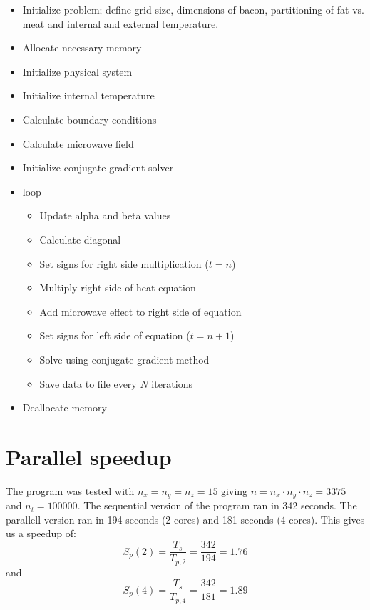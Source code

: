 \begin{itemize}
  \item Initialize problem; define grid-size, dimensions of bacon, partitioning
    of fat vs. meat and internal and external temperature.
  \item Allocate necessary memory
  \item Initialize physical system
  \item Initialize internal temperature
  \item Calculate boundary conditions
  \item Calculate microwave field
  \item Initialize conjugate gradient solver
  \item loop
  \begin{itemize}
    \item Update alpha and beta values
    \item Calculate diagonal
    \item Set signs for right side multiplication ($t=n$)
    \item Multiply right side of heat equation
    \item Add microwave effect to right side of equation
    \item Set signs for left side of equation ($t=n+1$)
    \item Solve using conjugate gradient method
    \item Save data to file every $N$ iterations
  \end{itemize}
\item Deallocate memory
\end{itemize}

\section{Parallel speedup}

The program was tested with $n_x=n_y=n_z=15$ giving $n=n_x\cdot n_y\cdot n_z=3375$ and $n_t=100000$.
The sequential version of the program ran in 342 seconds. 
The parallell version ran in 194 seconds (2 cores) and 181 seconds (4 cores).
This gives us a speedup of:
\begin{equation}
S_p(2) = \frac{T_s}{T_{p,2}} = \frac{342}{194} = 1.76
\end{equation}
and 
\begin{equation}
S_p(4) = \frac{T_s}{T_{p,4}} = \frac{342}{181} = 1.89
\end{equation}

